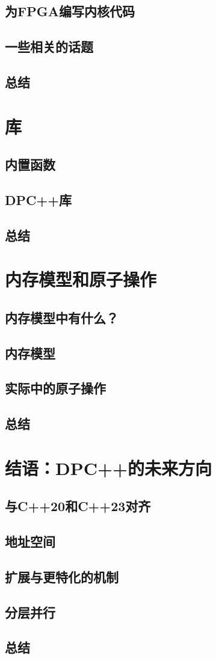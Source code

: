 \documentclass[11pt,a4paper,UTF8]{ctexart}
\begin{document}
		\subsection{为FPGA编写内核代码}
		\subsection{一些相关的话题}
		\subsection{总结}
	\section{库}
		\subsection{内置函数}
		\subsection{DPC++库}
		\subsection{总结}
	\section{内存模型和原子操作}
		\subsection{内存模型中有什么？}
		\subsection{内存模型}
		\subsection{实际中的原子操作}
		\subsection{总结}
	\section{结语：DPC++的未来方向}
		\subsection{与C++20和C++23对齐}
		\subsection{地址空间}
		\subsection{扩展与更特化的机制}
		\subsection{分层并行}
		\subsection{总结}
\end{document}
